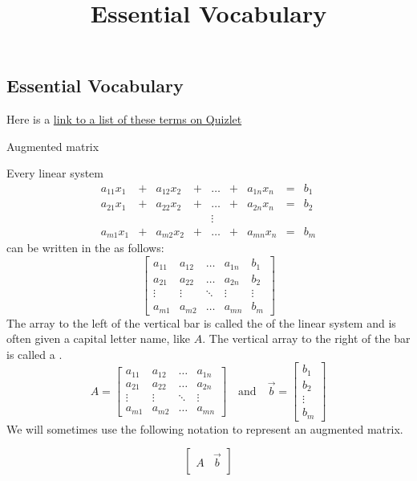 \documentclass{ximera}
\title{Essential Vocabulary} \license{CC BY-NC-SA 4.0}
\begin{document}
\begin{abstract}
\end{abstract}
\maketitle


\begin{onlineOnly}
\section*{Essential Vocabulary}
Here is a  \href{https://quizlet.com/880918143/chapter-2-vocabulary-flash-cards/?i=y06sd&x=1jqt}{link to a list of these terms on Quizlet}
\end{onlineOnly}



Augmented matrix
\begin{expandable}
    Every linear system 
$$\begin{array}{ccccccccc}
      a_{11}x_1 &+ &a_{12}x_2&+&\ldots&+&a_{1n}x_n&= &b_1 \\
	 a_{21}x_1 &+ &a_{22}x_2&+&\ldots&+&a_{2n}x_n&= &b_2 \\
     &&&&\vdots&&&& \\
     a_{m1}x_1 &+ &a_{m2}x_2&+&\ldots&+&a_{mn}x_n&= &b_m
    \end{array}$$
    can be written in the  as follows:
    $$\left[\begin{array}{cccc|c}  
 a_{11}&a_{12}&\ldots&a_{1n}&b_1\\a_{21}&a_{22}&\ldots&a_{2n}&b_2\\\vdots&\vdots&\ddots&\vdots&\vdots\\a_{m1}&a_{m2}&\ldots&a_{mn}&b_m
 \end{array}\right]$$
 The array to the left of the vertical bar is called the  of the linear system and is often given a capital letter name, like $A$.  The vertical array to the right of the bar is called a .
 $$A=\begin{bmatrix}a_{11}&a_{12}&\ldots&a_{1n}\\a_{21}&a_{22}&\ldots&a_{2n}\\\vdots&\vdots&\ddots&\vdots\\a_{m1}&a_{m2}&\ldots&a_{mn}\end{bmatrix}\quad\text{and}\quad\vec{b}=\begin{bmatrix}b_1\\b_2\\\vdots\\b_m\end{bmatrix}$$
We will sometimes use the following notation to represent an augmented matrix.

$$\left[\begin{array}{c|c}  
 A & \vec{b}\\
 \end{array}\right]$$
\end{expandable}
\end{document}
